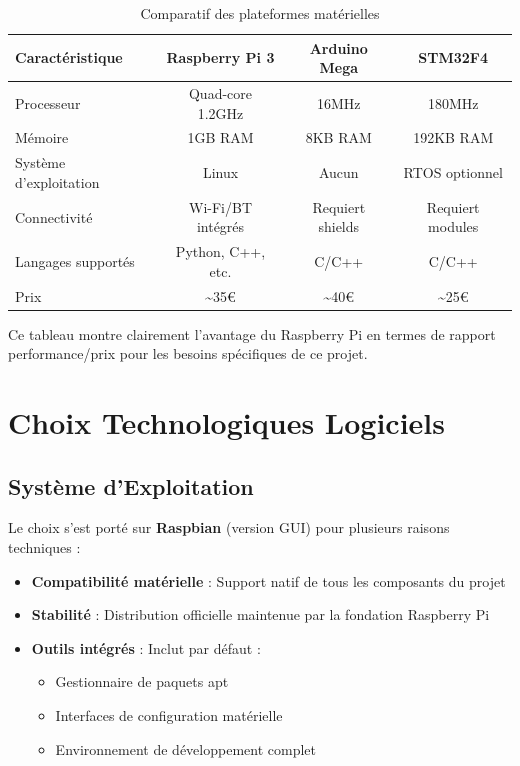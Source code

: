 \documentclass[a4paper, 12pt]{article}
\begin{document}
	\begin{table}[h]
		\centering
		\caption{Comparatif des plateformes matérielles}
		\begin{tabular}{|l|c|c|c|}
			\hline
			\textbf{Caractéristique} & \textbf{Raspberry Pi 3} & \textbf{Arduino Mega} & \textbf{STM32F4} \\
			\hline
			Processeur & Quad-core 1.2GHz & 16MHz & 180MHz \\
			\hline
			Mémoire & 1GB RAM & 8KB RAM & 192KB RAM \\
			\hline
			Système d'exploitation & Linux & Aucun & RTOS optionnel \\
			\hline
			Connectivité & Wi-Fi/BT intégrés & Requiert shields & Requiert modules \\
			\hline
			Langages supportés & Python, C++, etc. & C/C++ & C/C++ \\
			\hline
			Prix & \textasciitilde35€ & \textasciitilde40€ & \textasciitilde25€ \\
			\hline
		\end{tabular}
	\end{table}
	
	Ce tableau montre clairement l'avantage du Raspberry Pi en termes de rapport performance/prix pour les besoins spécifiques de ce projet.
	
	\section{Choix Technologiques Logiciels}
	
	\subsection{Système d'Exploitation}
	
	Le choix s'est porté sur \textbf{Raspbian} (version GUI) pour plusieurs raisons techniques :
	
	\begin{itemize}
		\item \textbf{Compatibilité matérielle} : Support natif de tous les composants du projet
		\item \textbf{Stabilité} : Distribution officielle maintenue par la fondation Raspberry Pi
		\item \textbf{Outils intégrés} : Inclut par défaut :
		\begin{itemize}
			\item Gestionnaire de paquets apt
			\item Interfaces de configuration matérielle
			\item Environnement de développement complet
		\end{itemize}
	\end{itemize}
	
\end{document}
